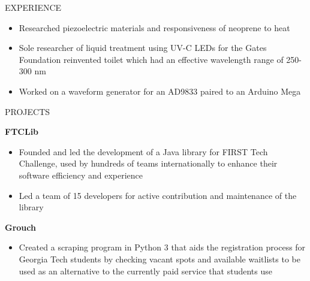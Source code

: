 \documentclass{resume} %
\begin{document}
\begin{rSection}{EXPERIENCE}
\vspace{-0.5em}
 \begin{itemize}
    \itemsep -5pt {} 
     \item Researched piezoelectric materials and responsiveness of neoprene to heat
     \item Sole researcher of liquid treatment using UV-C LEDs for the Gates Foundation
     reinvented toilet which had an effective wavelength range of 250-300 nm
     \item Worked on a waveform generator for an AD9833 paired to an Arduino Mega
 \end{itemize}
\end{rSection} 

\vspace{-0.8em}
\begin{rSection}{PROJECTS}
\vspace{-1.25em}
\item \textbf{FTCLib}
\vspace{-0.5em}
 \begin{itemize}
    \itemsep -5pt {} 
     \item Founded and led the development of a Java library for FIRST Tech Challenge, used by hundreds of teams internationally
     to enhance their software efficiency and experience
     \item Led a team of 15 developers for active contribution and maintenance of the library
 \end{itemize}
\vspace{-0.5em}
\item \textbf{Grouch}
\vspace{-0.5em}
 \begin{itemize}
    \itemsep -5pt {}
    \item Created a scraping program in Python 3 that aids the registration process for Georgia Tech students by
    checking vacant spots and available waitlists to be used as an alternative to the currently paid service
    that students use
 \end{itemize}
\end{rSection}
\end{document}
